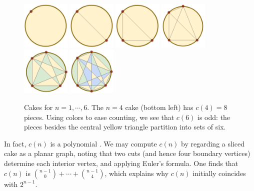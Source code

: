 \documentclass[twocolumn, 11pt]{article}
\theoremstyle{definition}
\begin{document}
        \begin{figure}[H]
            \centering
            \includegraphics[height=2.3cm]{cake-1}
            \includegraphics[height=2.3cm]{cake-2}
            \includegraphics[height=2.3cm]{cake-3}
            \includegraphics[height=2.3cm]{cake-4}
            \includegraphics[height=2.3cm]{cake-5-col}
            \includegraphics[height=2.3cm]{cake-6-col}
            \caption{{
                Cakes for $n=1,\cdots,6$.
                The $n=4$ cake (bottom left) has $c(4)=8$ pieces.
                Using colors to ease counting,
                we see that $c(6)$ is odd: the pieces besides the
                central yellow triangle partition into sets of six.
            }}
        \end{figure}

        In fact, $c(n)$ is a polynomial \cite{wetzel}.  We may compute $c(n)$
        by regarding a sliced cake as a planar graph, noting that two cuts (and
        hence four boundary vertices) determine each interior vertex, and
        applying Euler's formula.  One finds that $c(n)$ is ${n-1 \choose
        0}+\cdots+{n-1\choose 4}$, which explains why $c(n)$ initially
        coincides with $2^{n-1}$.
\end{document}
